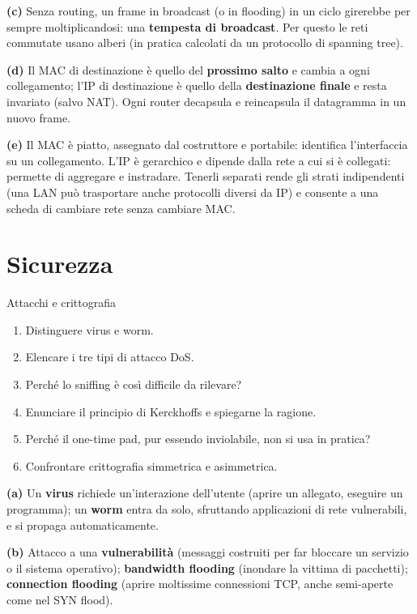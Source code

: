 \textbf{(c)} Senza routing, un frame in broadcast (o in flooding) in un ciclo girerebbe per sempre moltiplicandosi: una \textbf{tempesta di
broadcast}. Per questo le reti commutate usano alberi (in pratica calcolati da un protocollo di spanning tree).

\textbf{(d)} Il MAC di destinazione è quello del \textbf{prossimo salto} e cambia a ogni collegamento; l'IP di destinazione è quello della
\textbf{destinazione finale} e resta invariato (salvo NAT). Ogni router decapsula e reincapsula il datagramma in un nuovo frame.

\textbf{(e)} Il MAC è piatto, assegnato dal costruttore e portabile: identifica l'interfaccia su un collegamento. L'IP è gerarchico e
dipende dalla rete a cui si è collegati: permette di aggregare e instradare. Tenerli separati rende gli strati indipendenti (una LAN
può trasportare anche protocolli diversi da IP) e consente a una scheda di cambiare rete senza cambiare MAC.

\section{Sicurezza}

\begin{esercizio}{Attacchi e crittografia}
\begin{enumerate}[label=(\alph*)]
    \item Distinguere virus e worm.
    \item Elencare i tre tipi di attacco DoS.
    \item Perché lo sniffing è così difficile da rilevare?
    \item Enunciare il principio di Kerckhoffs e spiegarne la ragione.
    \item Perché il one-time pad, pur essendo inviolabile, non si usa in pratica?
    \item Confrontare crittografia simmetrica e asimmetrica.
\end{enumerate}
\end{esercizio}

\svolgimento
\textbf{(a)} Un \textbf{virus} richiede un'interazione dell'utente (aprire un allegato, eseguire un programma); un \textbf{worm} entra da solo,
sfruttando applicazioni di rete vulnerabili, e si propaga automaticamente.

\textbf{(b)} Attacco a una \textbf{vulnerabilità} (messaggi costruiti per far bloccare un servizio o il sistema operativo);
\textbf{bandwidth flooding} (inondare la vittima di pacchetti); \textbf{connection flooding} (aprire moltissime connessioni TCP, anche
semi-aperte come nel SYN flood).

